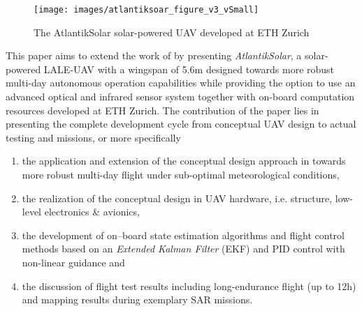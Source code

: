 \begin{figure}[b]
    \centering
    \texttt{[image: images/atlantiksoar\_figure\_v3\_vSmall]}
    \caption{The AtlantikSolar solar-powered UAV developed at ETH Zurich}
    \label{fig:AtlantikSolarCollage}
\end{figure}


This paper aims to extend the work of \cite{Cocconi_SoLong,Noth_PhD} by presenting \textit{AtlantikSolar}, a solar-powered LALE-UAV with a wingspan of 5.6m designed towards more robust multi-day autonomous operation capabilities while providing the option to use an advanced optical and infrared sensor system together with on-board computation resources developed at ETH Zurich. The contribution of the paper lies in presenting the complete development cycle from conceptual UAV design to actual testing and missions, or more specifically
  
 \begin{enumerate}
\item the application and extension of the conceptual design approach in \cite{Noth_PhD,Leutenegger_JIRS} towards more robust multi-day flight under sub-optimal meteorological conditions, 
\item the realization of the conceptual design in UAV hardware, i.e. structure, low-level electronics \& avionics, 
\item the development of on--board state estimation algorithms and flight control methods based on an \textit{Extended Kalman Filter} (EKF) and PID control with non-linear guidance and
\item the discussion of flight test results including long-endurance flight (up to 12h) and mapping results during exemplary SAR missions.
\end{enumerate}

